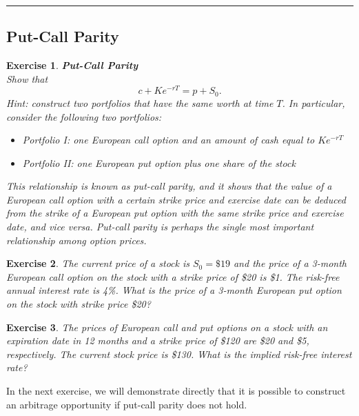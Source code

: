 \documentclass[letterpaper,10pt]{article}
\newtheorem{ex}{Exercise}
\begin{document}
\bigskip

\hrule

\bigskip

\subsection{Put-Call Parity}





\begin{ex}{\bf Put-Call Parity}\\
Show that $$c+Ke^{-rT}=p+S_0.$$  Hint:  construct two portfolios that have the same worth at time $T$.  In particular, consider the following two portfolios:

\begin{itemize}

\item Portfolio I:  one European call option and an amount of cash equal to $Ke^{-rT}$

\item Portfolio II:  one European put option plus one share of the stock

\end{itemize}

This relationship is known as {\em put-call parity}, and it shows that the value of a European call option with a certain strike price and exercise date can be deduced from the strike of a European put option with the same strike price and exercise date, and vice versa.  Put-call parity is perhaps the single most important relationship among option prices.
\end{ex}

\begin{ex}
The current price of a stock is $S_0=\$19$ and the price of a 3-month European call option on the stock with a strike price of \$20 is \$1.  The risk-free annual interest rate is 4\%.  What is the price of a 3-month European put option on the stock with strike price \$20?  
\end{ex}


\begin{ex}
The prices of European call and put options on a stock with an expiration date in 12 months and a strike price of \$120 are \$20 and \$5, respectively. The current stock price is \$130. What is the implied risk-free interest rate?
\end{ex}

\noindent In the next exercise, we will demonstrate directly that it is possible to construct an arbitrage opportunity if put-call parity does not hold.
\end{document}
